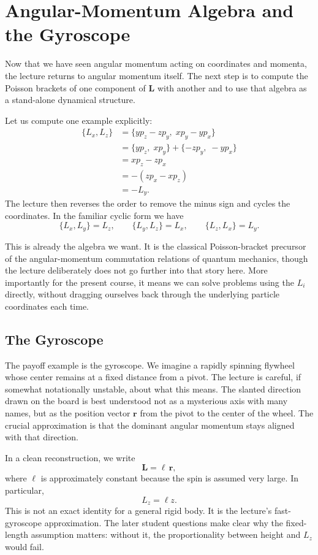 \section{Angular-Momentum Algebra and the Gyroscope}

Now that we have seen angular momentum acting on coordinates and momenta, the lecture returns to angular momentum itself. The next step is to compute the Poisson brackets of one component of \(\mathbf L\) with another and to use that algebra as a stand-alone dynamical structure.

Let us compute one example explicitly:
\begin{align}
\{L_x,L_z\}
&=\{yp_z-zp_y,\;xp_y-yp_x\}\\
&=\{yp_z,\;xp_y\}+\{-zp_y,\;-yp_x\}\\
&=xp_z-zp_x\\
&=-(zp_x-xp_z)\\
&=-L_y.
\end{align}
The lecture then reverses the order to remove the minus sign and cycles the coordinates. In the familiar cyclic form we have
\begin{equation}
\{L_x,L_y\}=L_z,\qquad
\{L_y,L_z\}=L_x,\qquad
\{L_z,L_x\}=L_y.
\end{equation}

This is already the algebra we want. It is the classical Poisson-bracket precursor of the angular-momentum commutation relations of quantum mechanics, though the lecture deliberately does not go further into that story here. More importantly for the present course, it means we can solve problems using the \(L_i\) directly, without dragging ourselves back through the underlying particle coordinates each time.

\subsection{The Gyroscope}

The payoff example is the gyroscope. We imagine a rapidly spinning flywheel whose center remains at a fixed distance from a pivot. The lecture is careful, if somewhat notationally unstable, about what this means. The slanted direction drawn on the board is best understood not as a mysterious axis with many names, but as the position vector \(\mathbf r\) from the pivot to the center of the wheel. The crucial approximation is that the dominant angular momentum stays aligned with that direction.

In a clean reconstruction, we write
\begin{equation}
\mathbf L=\ell\,\mathbf r,
\end{equation}
where \(\ell\) is approximately constant because the spin is assumed very large. In particular,
\begin{equation}
L_z=\ell z.
\end{equation}
This is not an exact identity for a general rigid body. It is the lecture's fast-gyroscope approximation. The later student questions make clear why the fixed-length assumption matters: without it, the proportionality between height and \(L_z\) would fail.

